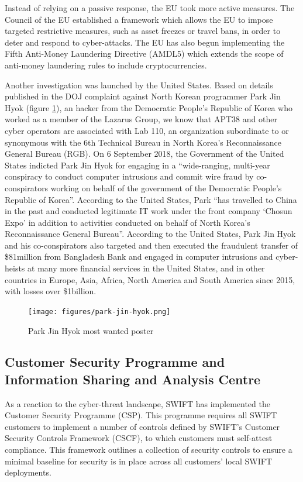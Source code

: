 \documentclass[12pt]{article}
\begin{document}
        Instead of relying on a passive response, the EU took more active measures. The Council of the EU established a framework which allows the EU to impose targeted restrictive measures, such as asset freezes or travel bans, in order to deter and respond to cyber-attacks. The EU has also begun implementing the Fifth Anti-Money Laundering Directive (AMDL5) which extends the scope of anti-money laundering  rules to include cryptocurrencies. 
        
        Another investigation was launched by the United States. Based on details published in the DOJ complaint against North Korean programmer Park Jin Hyok (figure \ref{fig:jin}), an hacker from the Democratic People’s Republic of Korea who worked as a member of the Lazarus Group, we know that APT38 and other cyber operators are associated with Lab 110, an organization subordinate to or synonymous with the 6th Technical Bureau in North Korea's Reconnaissance General Bureau (RGB). On 6 September 2018, the Government of the United States indicted Park Jin Hyok for engaging in a “wide-ranging, multi-year conspiracy to conduct computer intrusions and commit wire fraud by co-conspirators working on behalf of the government of the Democratic People’s Republic of Korea”. According to the United States, Park “has travelled to China in the past and conducted legitimate IT work under the front company ‘Chosun Expo’ in addition to activities conducted on behalf of North Korea’s Reconnaissance General Bureau”. According to the United States, Park Jin Hyok and his co-conspirators also targeted and then executed the fraudulent transfer of \$81million from Bangladesh Bank and engaged in computer intrusions and cyber-heists at many more financial services in the United States, and in other countries in Europe, Asia, Africa, North America and South America since 2015, with losses over \$1billion.
        
        \begin{figure}[H]
        \centering
        \texttt{[image: figures/park-jin-hyok.png]}
        \caption{Park Jin Hyok most wanted poster}
        \label{fig:jin}
        \end{figure}
       
        \subsection{Customer Security Programme and Information Sharing and Analysis Centre}
        
        As a reaction to the cyber-threat landscape, SWIFT has implemented the Customer Security Programme (CSP). This programme requires all SWIFT customers to implement a number of controls defined by SWIFT’s Customer Security Controls Framework (CSCF), to which customers must self-attest compliance. This framework outlines a collection of security controls to ensure a minimal baseline for security is in place across all customers’ local SWIFT deployments.
        
\end{document}
